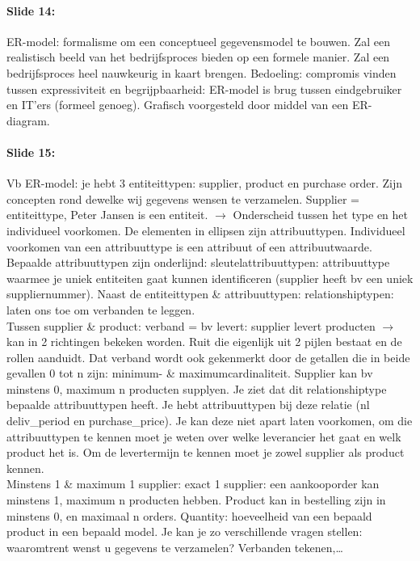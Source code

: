 \documentclass[10pt,a4paper]{report}
\begin{document}
\paragraph{Slide 14:}ER-model: formalisme om een conceptueel gegevensmodel te bouwen. Zal een realistisch beeld van het bedrijfsproces bieden op een formele manier. Zal een bedrijfsproces heel nauwkeurig in kaart brengen. Bedoeling: compromis vinden tussen expressiviteit en begrijpbaarheid: ER-model is brug tussen eindgebruiker en IT'ers (formeel genoeg).
Grafisch voorgesteld door middel van een ER-diagram.

\paragraph{Slide 15:}Vb ER-model: je hebt 3 entiteittypen: supplier, product en purchase order. Zijn concepten rond dewelke wij gegevens wensen te verzamelen. Supplier = entiteittype, Peter Jansen is een entiteit. $\rightarrow$ Onderscheid tussen het type en het individueel voorkomen. De elementen in ellipsen zijn attribuuttypen. Individueel voorkomen van een attribuuttype is een attribuut of een attribuutwaarde. Bepaalde attribuuttypen zijn onderlijnd: sleutelattribuuttypen: attribuuttype waarmee je uniek entiteiten gaat kunnen identificeren (supplier heeft bv een uniek suppliernummer). Naast de entiteittypen \& attribuuttypen: relationshiptypen: laten ons toe om verbanden te leggen.\\
Tussen supplier \& product: verband = bv levert: supplier levert producten $\rightarrow$ kan in 2 richtingen bekeken worden. Ruit die eigenlijk uit 2 pijlen bestaat en de rollen aanduidt. Dat verband wordt ook gekenmerkt door de getallen die in beide gevallen 0 tot n zijn: minimum- \& maximumcardinaliteit. Supplier kan bv minstens 0, maximum n producten supplyen. Je ziet dat dit relationshiptype bepaalde attribuuttypen heeft. Je hebt attribuuttypen bij deze relatie (nl deliv\_period en purchase\_price). Je kan deze niet apart laten voorkomen, om die attribuuttypen te kennen moet je weten over welke leverancier het gaat en welk product het is. Om de levertermijn te kennen moet je zowel supplier als product kennen.\\
Minstens 1 \& maximum 1 supplier: exact 1 supplier: een aankooporder kan minstens 1, maximum n producten hebben. Product kan in bestelling zijn in minstens 0, en maximaal n orders. Quantity: hoeveelheid van een bepaald product in een bepaald model.
Je kan je zo verschillende vragen stellen: waaromtrent wenst u gegevens te verzamelen? Verbanden tekenen,…
\end{document}
